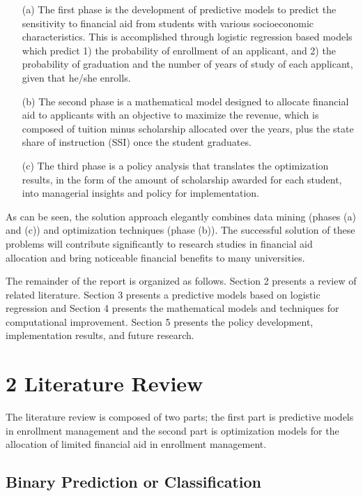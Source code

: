 \documentclass[12pt,english]{report}
\begin{document}
\begin{itemize}
\item [(a)] The first phase is the development of predictive models to predict the sensitivity to financial aid from students with various socioeconomic characteristics. This is accomplished through logistic regression based models which predict 1) the probability of enrollment of an applicant, and 2) the probability of graduation and the number of years of study of each applicant, given that he/she enrolls. 

\item [(b)] The second phase is a mathematical model designed to allocate financial aid to applicants with an objective to maximize the revenue, which is composed of tuition minus scholarship allocated over the years, plus the state share of instruction (SSI) once the student graduates.

\item [(c)] The third phase is a policy analysis that translates the optimization results, in the form of the  amount of scholarship awarded for each student, into managerial insights and policy for implementation. 
\end{itemize}

As can be seen, the solution approach elegantly combines data mining (phases (a) and (c)) and optimization techniques (phase (b)). The successful solution of these problems will contribute significantly to research studies in financial aid allocation and bring noticeable financial benefits to many universities. 

The remainder of the report is organized as follows. Section 2 presents a review of related literature. Section 3 presents a predictive models based on logistic regression and Section 4 presents the mathematical models and techniques for computational improvement. Section 5 presents the policy development, implementation results, and future research. 


\chapter{2 Literature Review}
The literature review is composed of two parts; the first part is predictive models in enrollment management and the second part is optimization models for the allocation of limited financial aid in enrollment management.  

\section{Binary Prediction or Classification }
\end{document}
